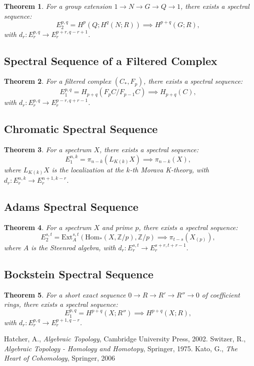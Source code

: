 \documentclass{article}
\theoremstyle{plain}
\newtheorem{theorem}{Theorem}
\theoremstyle{definition}
\newcommand{\Z}{\mathbb{Z}}
\newcommand{\Ext}{\text{Ext}}
\newcommand{\Hom}{\text{Hom}}
\begin{document}
\begin{theorem}
For a group extension \( 1 \to N \to G \to Q \to 1 \), there exists a spectral sequence:
\[
E_2^{p,q} = H^p(Q; H^q(N; R)) \implies H^{p+q}(G; R),
\]
with \( d_r: E_r^{p,q} \to E_r^{p+r, q-r+1} \).
\end{theorem}

\subsection{Spectral Sequence of a Filtered Complex}

\begin{theorem}
For a filtered complex \( (C_*, F_p) \), there exists a spectral sequence:
\[
E_1^{p,q} = H_{p+q}(F_p C / F_{p-1} C) \implies H_{p+q}(C),
\]
with \( d_r: E_r^{p,q} \to E_r^{p-r, q+r-1} \).
\end{theorem}

\subsection{Chromatic Spectral Sequence}

\begin{theorem}
For a spectrum \( X \), there exists a spectral sequence:
\[
E_1^{n,k} = \pi_{n-k}(L_{K(k)} X) \implies \pi_{n-k}(X),
\]
where \( L_{K(k)} X \) is the localization at the \( k \)-th Morava K-theory, with \( d_r: E_r^{n,k} \to E_r^{n+1,k-r} \).
\end{theorem}

\subsection{Adams Spectral Sequence}

\begin{theorem}
For a spectrum \( X \) and prime \( p \), there exists a spectral sequence:
\[
E_2^{s,t} = \Ext_A^{s,t}(\Hom_*(X, \Z/p), \Z/p) \implies \pi_{t-s}(X_{(p)}),
\]
where \( A \) is the Steenrod algebra, with \( d_r: E_r^{s,t} \to E_r^{s+r, t+r-1} \).
\end{theorem}

\subsection{Bockstein Spectral Sequence}

\begin{theorem}
For a short exact sequence \( 0 \to R \to R' \to R'' \to 0 \) of coefficient rings, there exists a spectral sequence:
\[
E_1^{p,q} = H^{p+q}(X; R'') \implies H^{p+q}(X; R),
\]
with \( d_r: E_r^{p,q} \to E_r^{p+1,q-r} \).
\end{theorem}


\begin{thebibliography}{9}
 Hatcher, A., \emph{Algebraic Topology}, Cambridge University Press, 2002.
 Switzer, R., \emph{Algebraic Topology - Homology and Homotopy}, Springer, 1975.
    Kato, G.,    \emph{The Heart of Cohomology}, Springer, 2006
\end{thebibliography}
\end{document}
